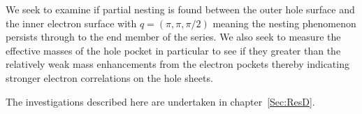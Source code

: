 We seek to examine if partial nesting is found between the outer hole surface and the inner electron surface with $q=(\pi, \pi, \pi/2)$ meaning the nesting phenomenon persists through to the end member of the series. We also seek to measure the effective masses of the hole pocket in particular to see if they greater than the relatively weak mass enhancements from the electron pockets thereby indicating stronger electron correlations on the hole sheets.

The investigations described here are undertaken in chapter~\ref{Sec:ResD}.





